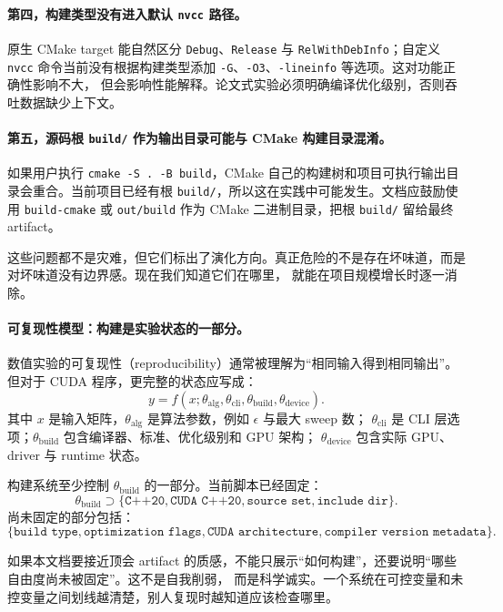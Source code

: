 \paragraph{第四，构建类型没有进入默认 \texttt{nvcc} 路径。}
原生 CMake target 能自然区分 \texttt{Debug}、\texttt{Release} 与 \texttt{RelWithDebInfo}；自定义 \texttt{nvcc}
命令当前没有根据构建类型添加 \texttt{-G}、\texttt{-O3}、\texttt{-lineinfo} 等选项。这对功能正确性影响不大，
但会影响性能解释。论文式实验必须明确编译优化级别，否则吞吐数据缺少上下文。

\paragraph{第五，源码根 \texttt{build/} 作为输出目录可能与 CMake 构建目录混淆。}
如果用户执行 \texttt{cmake -S . -B build}，CMake 自己的构建树和项目可执行输出目录会重合。当前项目已经有根
\texttt{build/}，所以这在实践中可能发生。文档应鼓励使用 \texttt{build-cmake} 或 \texttt{out/build} 作为
CMake 二进制目录，把根 \texttt{build/} 留给最终 artifact。

这些问题都不是灾难，但它们标出了演化方向。真正危险的不是存在坏味道，而是对坏味道没有边界感。现在我们知道它们在哪里，
就能在项目规模增长时逐一消除。

\paragraph{可复现性模型：构建是实验状态的一部分。}

数值实验的可复现性（reproducibility）通常被理解为“相同输入得到相同输出”。但对于 CUDA 程序，更完整的状态应写成：
\[
    y =
    f(x;\theta_{\mathrm{alg}},\theta_{\mathrm{cli}},
    \theta_{\mathrm{build}},\theta_{\mathrm{device}}).
\]
其中 \(x\) 是输入矩阵，\(\theta_{\mathrm{alg}}\) 是算法参数，例如 \(\epsilon\) 与最大 sweep 数；
\(\theta_{\mathrm{cli}}\) 是 CLI 层选项；\(\theta_{\mathrm{build}}\) 包含编译器、标准、优化级别和 GPU 架构；
\(\theta_{\mathrm{device}}\) 包含实际 GPU、driver 与 runtime 状态。

构建系统至少控制 \(\theta_{\mathrm{build}}\) 的一部分。当前脚本已经固定：
\[
    \theta_{\mathrm{build}}
    \supset
    \{\texttt{C++20},\texttt{CUDA C++20},\texttt{source set},\texttt{include dir}\}.
\]
尚未固定的部分包括：
\[
    \{\texttt{build type},\texttt{optimization flags},\texttt{CUDA architecture},
    \texttt{compiler version metadata}\}.
\]

如果本文档要接近顶会 artifact 的质感，不能只展示“如何构建”，还要说明“哪些自由度尚未被固定”。这不是自我削弱，
而是科学诚实。一个系统在可控变量和未控变量之间划线越清楚，别人复现时越知道应该检查哪里。

